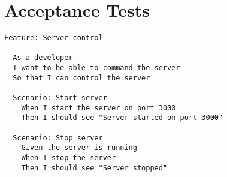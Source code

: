 \chapter{Acceptance Tests} %
\label{acceptance_tests}

\begin{lstlisting}[label=act0,caption=acceptance test.]
Feature: Server control

  As a developer
  I want to be able to command the server
  So that I can control the server

  Scenario: Start server
    When I start the server on port 3000
    Then I should see "Server started on port 3000"

  Scenario: Stop server
    Given the server is running
    When I stop the server
    Then I should see "Server stopped"
\end{lstlisting}

